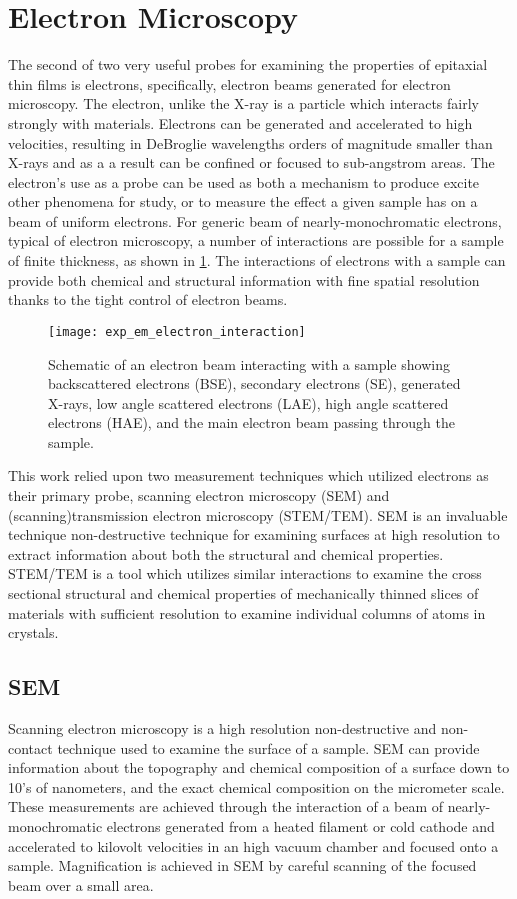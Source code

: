 \section{Electron Microscopy}
The second of two very useful probes for examining the properties of epitaxial thin films is electrons, specifically, electron beams generated for electron microscopy.
The electron, unlike the X-ray is a particle which interacts fairly strongly with materials.
Electrons can be generated and accelerated to high velocities, resulting in DeBroglie wavelengths orders of magnitude smaller than X-rays and as a a result can be confined or focused to sub-angstrom areas.
The electron's use as a probe can be used as both a mechanism to produce excite other phenomena for study, or to measure the effect a given sample has on a beam of uniform electrons.
For generic beam of nearly-monochromatic electrons, typical of electron microscopy, a number of interactions are possible for a sample of finite thickness, as shown in \cref{fig:exp_em_electron_interaction}.
The interactions of electrons with a sample can provide both chemical and structural information with fine spatial resolution thanks to the tight control of electron beams.
\begin{figure}
 \centering \texttt{[image: exp\_em\_electron\_interaction]}
 \caption[Electron interactions with materials]{\label{fig:exp_em_electron_interaction}Schematic of an electron beam interacting with a sample showing backscattered electrons (BSE), secondary electrons (SE), generated X-rays, low angle scattered electrons (LAE), high angle scattered electrons (HAE), and the main electron beam passing through the sample.}
\end{figure}

This work relied upon two measurement techniques which utilized electrons as their primary probe, scanning electron microscopy (SEM) and (scanning)transmission electron microscopy (STEM/TEM).
SEM is an invaluable technique non-destructive technique for examining surfaces at high resolution to extract information about both the structural and chemical properties.
STEM/TEM is a tool which utilizes similar interactions to examine the cross sectional structural and chemical properties of mechanically thinned slices of materials with sufficient resolution to examine individual columns of atoms in crystals.
\subsection{SEM} Scanning electron microscopy is a high resolution non-destructive and non-contact technique used to examine the surface of a sample.
SEM can provide information about the topography and chemical composition of a surface down to 10's of nanometers, and the exact chemical composition on the micrometer scale.
These measurements are achieved through the interaction of a beam of nearly-monochromatic electrons generated from a heated filament or cold cathode and accelerated to kilovolt velocities in an high vacuum chamber and focused onto a sample.
Magnification is achieved in SEM by careful scanning of the focused beam over a small area.

